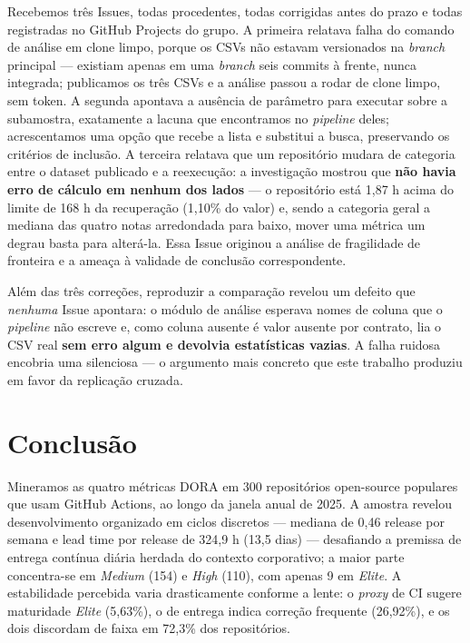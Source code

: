Recebemos três Issues, todas procedentes, todas corrigidas antes do prazo e todas registradas
no GitHub Projects do grupo. A primeira relatava falha do comando de análise em clone limpo,
porque os CSVs não estavam versionados na \emph{branch} principal --- existiam apenas em uma
\emph{branch} seis commits à frente, nunca integrada; publicamos os três CSVs e a análise
passou a rodar de clone limpo, sem token. A segunda apontava a ausência de parâmetro para
executar sobre a subamostra, exatamente a lacuna que encontramos no \emph{pipeline} deles;
acrescentamos uma opção que recebe a lista e substitui a busca, preservando os critérios de
inclusão. A terceira relatava que um repositório mudara de categoria entre o dataset
publicado e a reexecução: a investigação mostrou que \textbf{não havia erro de cálculo em
nenhum dos lados} --- o repositório está 1,87 h acima do limite de 168 h da recuperação
(1,10\% do valor) e, sendo a categoria geral a mediana das quatro notas arredondada para
baixo, mover uma métrica um degrau basta para alterá-la. Essa Issue originou a análise de
fragilidade de fronteira e a ameaça à validade de conclusão correspondente.

Além das três correções, reproduzir a comparação revelou um defeito que \emph{nenhuma} Issue
apontara: o módulo de análise esperava nomes de coluna que o \emph{pipeline} não escreve e,
como coluna ausente é valor ausente por contrato, lia o CSV real \textbf{sem erro algum e
devolvia estatísticas vazias}. A falha ruidosa encobria uma silenciosa --- o argumento mais
concreto que este trabalho produziu em favor da replicação cruzada.

\section{Conclusão}
\label{sec:conclusao}

Mineramos as quatro métricas DORA em 300 repositórios open-source populares que usam GitHub
Actions, ao longo da janela anual de 2025. A amostra revelou desenvolvimento organizado em
ciclos discretos --- mediana de 0,46 release por semana e lead time por release de 324,9 h
(13,5 dias) --- desafiando a premissa de entrega contínua diária herdada do contexto
corporativo; a maior parte concentra-se em \emph{Medium} (154) e \emph{High} (110), com apenas
9 em \emph{Elite}. A estabilidade percebida varia drasticamente conforme a lente: o
\emph{proxy} de CI sugere maturidade \emph{Elite} (5,63\%), o de entrega indica correção
frequente (26,92\%), e os dois discordam de faixa em 72,3\% dos repositórios.

